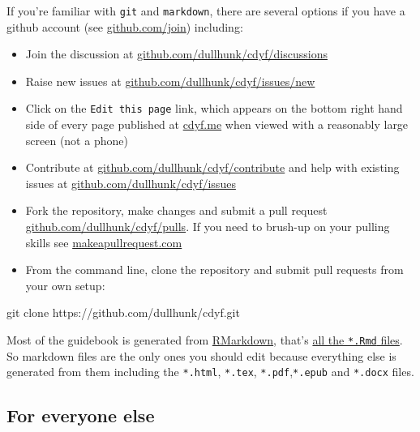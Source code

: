 \documentclass[
]{book}
\newenvironment{Shaded}{\begin{snugshade}}{\end{snugshade}}
\newcommand{\NormalTok}[1]{#1}
\providecommand{\tightlist}{%
  \setlength{\itemsep}{0pt}\setlength{\parskip}{0pt}}
\begin{document}
If you're familiar with \texttt{git} and \texttt{markdown}, there are several options if you have a github account (see \href{https://github.com/join}{github.com/join}) including:

\begin{itemize}
\tightlist
\item
  Join the discussion at \href{https://github.com/dullhunk/cdyf/discussions}{github.com/dullhunk/cdyf/discussions}
\item
  Raise new issues at \href{https://github.com/dullhunk/cdyf/issues/new}{github.com/dullhunk/cdyf/issues/new}
\item
  Click on the \texttt{Edit\ this\ page} link, which appears on the bottom right hand side of every page published at \href{https://www.cdyf.me}{cdyf.me} when viewed with a reasonably large screen (not a phone)
\item
  Contribute at \href{https://github.com/dullhunk/cdyf/contribute}{github.com/dullhunk/cdyf/contribute} and help with existing issues at \href{https://github.com/dullhunk/cdyf/issues}{github.com/dullhunk/cdyf/issues}
\item
  Fork the repository, make changes and submit a pull request \href{https://github.com/dullhunk/cdyf/pulls}{github.com/dullhunk/cdyf/pulls}. If you need to brush-up on your pulling skills see \href{http://makeapullrequest.com/}{makeapullrequest.com}
\item
  From the command line, clone the repository and submit pull requests from your own setup:
\end{itemize}

\begin{Shaded}
\begin{Highlighting}[]
\NormalTok{git clone https://github.com/dullhunk/cdyf.git}
\end{Highlighting}
\end{Shaded}

Most of the guidebook is generated from \href{https://en.wikipedia.org/wiki/Markdown}{RMarkdown}, that's \href{https://github.com/dullhunk/cdyf/search?l=RMarkdown}{all the \texttt{*.Rmd} files}. So markdown files are the only ones you should edit because everything else is generated from them including the \texttt{*.html}, \texttt{*.tex}, \texttt{*.pdf},\texttt{*.epub} and \texttt{*.docx} files.

\hypertarget{elseif}{%
\subsection{For everyone else}\label{elseif}}
\end{document}
